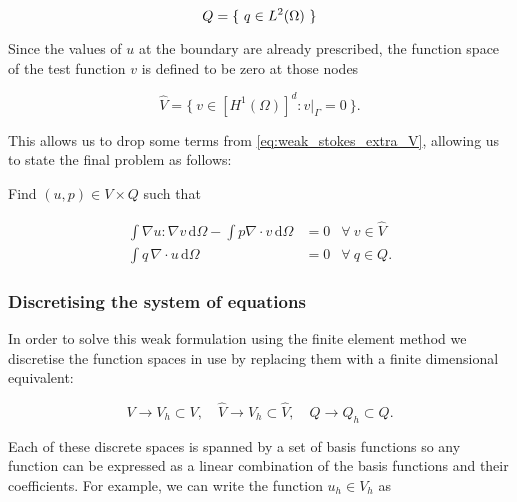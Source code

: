 \documentclass[thesis]{subfiles}
\begin{document}
\begin{equation}
  Q = \{ \ q \in L^2(\Omega) \ \}  \\
  \label{eq:stokes_pressure_space}
\end{equation}

Since the values of $u$ at the boundary are already prescribed, the function space of the test function $v$ is defined to be zero at those nodes

\begin{equation*}
  \hat V = \{\ v \in [H^1(\Omega)]^d : v|_{\Gamma} = 0 \ \}.
\end{equation*}

This allows us to drop some terms from \cref{eq:weak_stokes_extra_V}, allowing us to state the final problem as follows:

\vspace{1em}

Find $(u, p) \in V \times Q$ such that

\begin{subequations}
  \begin{align}
    \int \nabla u : \nabla v \, \textrm{d}\Omega
    - \int p \nabla \cdot v \, \textrm{d}\Omega
    &= 0
    &\forall \ v \in \hat V
    \label{eq:weak_stokes_V} \\
    \int q \, \nabla \cdot u \, \textrm{d}\Omega
    &= 0
    &\forall \ q \in Q.
    \label{eq:weak_stokes_Q}
  \end{align}
  \label{eq:weak_stokes}
\end{subequations}

\subsubsection{Discretising the system of equations}

In order to solve this weak formulation using the finite element method we discretise the function spaces in use by replacing them with a finite dimensional equivalent:

\begin{equation*}
  V \to V_h \subset V,
  \quad
  \hat V \to \hat V_h \subset \hat V,
  \quad
  Q \to Q_h \subset Q.
\end{equation*}

Each of these discrete spaces is spanned by a set of basis functions so any function can be expressed as a linear combination of the basis functions and their coefficients.
For example, we can write the function $u_h \in V_h$ as
\end{document}
